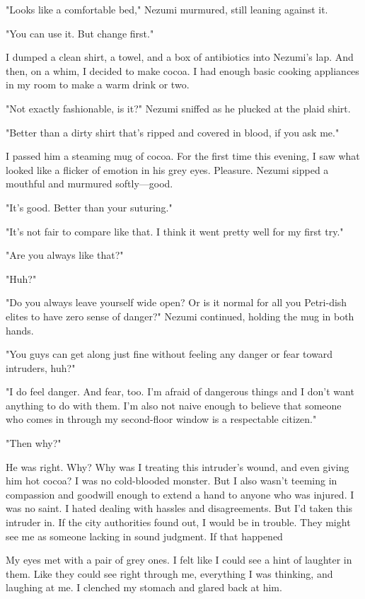 \mybreak

"Looks like a comfortable bed," Nezumi murmured, still leaning against
it.

"You can use it. But change first."

I dumped a clean shirt, a towel, and a box of antibiotics into Nezumi's
lap. And then, on a whim, I decided to make cocoa. I had enough basic
cooking appliances in my room to make a warm drink or two.

"Not exactly fashionable, is it?" Nezumi sniffed as he plucked at the
plaid shirt.

"Better than a dirty shirt that's ripped and covered in blood, if you
ask me."

I passed him a steaming mug of cocoa. For the first time this evening, I
saw what looked like a flicker of emotion in his grey eyes. Pleasure.
Nezumi sipped a mouthful and murmured softly---good.

"It's good. Better than your suturing."

"It's not fair to compare like that. I think it went pretty well for my
first try."

"Are you always like that?"

"Huh?"

"Do you always leave yourself wide open? Or is it normal for all you
Petri-dish elites to have zero sense of danger?" Nezumi continued,
holding the mug in both hands.

"You guys can get along just fine without feeling any danger or fear
toward intruders, huh?"

"I do feel danger. And fear, too. I'm afraid of dangerous things and I
don't want anything to do with them. I'm also not naive enough to
believe that someone who comes in through my second-floor window is a
respectable citizen."

"Then why?"

He was right. Why? Why was I treating this intruder's wound, and even
giving him hot cocoa? I was no cold-blooded monster. But I also wasn't
teeming in compassion and goodwill enough to extend a hand to anyone who
was injured. I was no saint. I hated dealing with hassles and
disagreements. But I'd taken this intruder in. If the city authorities
found out, I would be in trouble. They might see me as someone lacking
in sound judgment. If that happened\el 

My eyes met with a pair of grey ones. I felt like I could see a hint of
laughter in them. Like they could see right through me, everything I was
thinking, and laughing at me. I clenched my stomach and glared back at
him.


